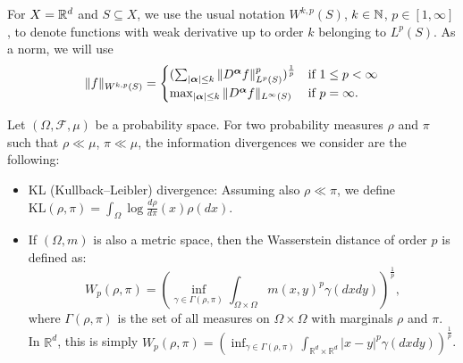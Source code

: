   For $X=\mathbb{R}^d$ and $S\subseteq X$, we use the usual notation
  $W^{k,p}(S)$, $k\in\mathbb{N}$, $p\in [1,\infty]$, to denote functions with
  weak derivative up to order $k$ belonging to $L^p(S)$. As a norm,
  we will use
  \begin{equation*}
    \|f\|_{W^{k, p}(S)} =
    \begin{cases}
      (\sum_{|{\boldsymbol \alpha}|\leq k} \|D^{\boldsymbol \alpha} f\|^p_{L^p(S)})^\frac{1}{p} & \text{if $ 1\leq p < \infty$}\\
      \max_{|{\boldsymbol \alpha}|\leq k} \|D^{\boldsymbol \alpha} f\|_{L^\infty(S)}& \text{if
        $ p = \infty$}.
    \end{cases}
  \end{equation*}


Let $(\Omega, \mathcal{F}, \mu)$ be a probability space. For two
probability measures $\rho$ and $\pi$ such that $\rho\ll\mu$, $\pi\ll\mu$, the information divergences we consider are the following:
\begin{itemize}
\item KL (Kullback--Leibler) divergence: Assuming also $\rho\ll\pi$, we define
  $\text{KL}(\rho, \pi) = \int_\Omega
  \log \frac{d\rho}{d\pi}(x) \rho(dx)$.
    
\item If $(\Omega, m)$ is also a metric space, then
  the Wasserstein distance of order $p$ is defined as:
  $$W_p(\rho, \pi) = \left(\inf_{\gamma\in\Gamma(\rho, \pi)}\int_{\Omega\times\Omega} m(x,
    y)^p\gamma(dxdy)\right)^\frac{1}{p},$$ where $\Gamma(\rho, \pi)$ is
  the set of all measures on $\Omega \times \Omega$ with marginals
  $\rho$ and $\pi$. In $\mathbb{R}^d$, this is simply
  $W_p(\rho, \pi) = \left(\inf_{\gamma\in\Gamma(\rho,
      \pi)}\int_{\mathbb{R}^d\times\mathbb{R}^d}|x-y|^p\gamma(dxdy)\right)^\frac{1}{p}$.
    
\end{itemize}



